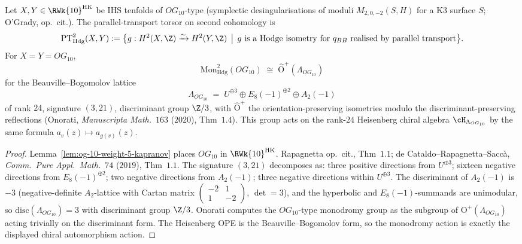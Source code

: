 \begin{theorem}
\label{thm:rw10-markman-monodromy-og10}
Let $X, Y \in \RWk{10}^{\mathrm{HK}}$ be IHS tenfolds of
$OG_{10}$-type (symplectic desingularisations of moduli
$M_{2, 0, -2}(S, H)$ for a K$3$ surface $S$; O'Grady, op.\ cit.).
The parallel-transport torsor on second cohomology is
\[
 \mathrm{PT}^2_{\mathrm{Hdg}}(X,Y)
 :=
 \bigl\{
 g:H^2(X,\Z)\xrightarrow{\sim}H^2(Y,\Z)
 \,\bigm|\,
 g \text{ is a Hodge isometry for } q_{BB}
 \text{ realised by parallel transport}
 \bigr\}.
\]
For $X=Y=OG_{10}$,
\[
 \mathrm{Mon}^2_{\mathrm{Hdg}}(OG_{10})
 \;\cong\;
 \widehat{\mathrm{O}}^+(\Lambda_{OG_{10}})
\]
for the Beauville--Bogomolov lattice
\[
 \Lambda_{OG_{10}} \;=\; U^{\oplus 3} \oplus E_8(-1)^{\oplus 2}
 \oplus A_2(-1)
\]
of rank $24$, signature $(3, 21)$, discriminant group $\Z/3$, with
$\widehat{\mathrm{O}}^+$ the orientation-preserving isometries modulo
the discriminant-preserving reflections (Onorati,
\emph{Manuscripta Math.}~$163$ \textup{(}$2020$\textup{)}, Thm~$1.4$).
This group acts on the rank-$24$ Heisenberg chiral algebra
\(\cH_{\Lambda_{OG_{10}}}\) by the same formula
\(a_v(z)\mapsto a_{g(v)}(z)\).
\end{theorem}

\begin{proof}
Lemma~\ref{lem:og-10-weight-5-kapranov} places \(OG_{10}\) in
\(\RWk{10}^{\mathrm{HK}}\).
Rapagnetta op.\ cit., Thm~$1.1$; de Cataldo--Rapagnetta--Sacc\`a,
\emph{Comm.\ Pure Appl.\ Math.}~$74$ \textup{(}$2019$\textup{)}, Thm~$1.1$.
The signature $(3, 21)$ decomposes as: three positive directions from
$U^{\oplus 3}$; sixteen negative directions from $E_8(-1)^{\oplus 2}$;
two negative directions from $A_2(-1)$; three negative directions
within $U^{\oplus 3}$. The discriminant of $A_2(-1)$ is $-3$
(negative-definite $A_2$-lattice with Cartan matrix
$\begin{pmatrix} -2 & 1 \\ 1 & -2 \end{pmatrix}$,
$\det = 3$), and the hyperbolic and $E_8(-1)$-summands are unimodular,
so $\mathrm{disc}(\Lambda_{OG_{10}}) = 3$ with discriminant group
$\Z/3$.
Onorati computes the \(OG_{10}\)-type monodromy group as the subgroup
of \(\mathrm{O}^+(\Lambda_{OG_{10}})\) acting trivially on the
discriminant form. The Heisenberg OPE is the Beauville--Bogomolov
form, so the monodromy action is exactly the displayed chiral
automorphism action.
\end{proof}

